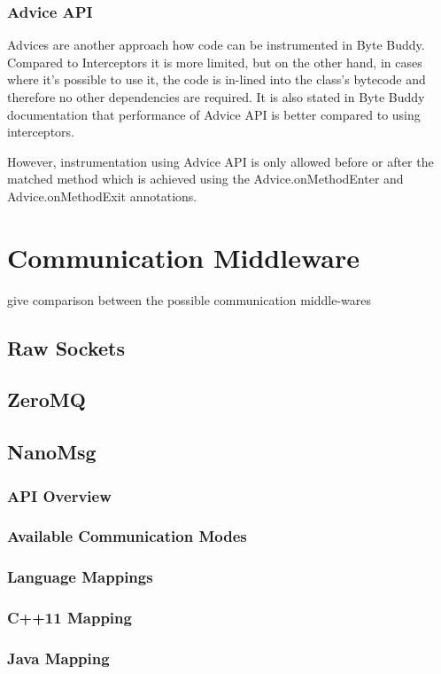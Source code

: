 \subsubsection{Advice API}
Advices are another approach how code can be instrumented in Byte Buddy. Compared to Interceptors it is more limited, but on the other hand, in cases where it's possible to use it, the code is in-lined into the class's bytecode and therefore no other dependencies are required. It is also stated in Byte Buddy documentation that performance of Advice API is better compared to using interceptors.

However, instrumentation using Advice API is only allowed before or after the matched method which is achieved using the Advice.onMethodEnter and Advice.onMethodExit annotations.

\section{Communication Middleware}
give comparison between the possible communication middle-wares
\subsection{Raw Sockets}
\subsection{ZeroMQ}
\subsection{NanoMsg}
\subsubsection{API Overview}
\subsubsection{Available Communication Modes}
\subsubsection{Language Mappings}
\subsubsection{C++11 Mapping}
\subsubsection{Java Mapping}

